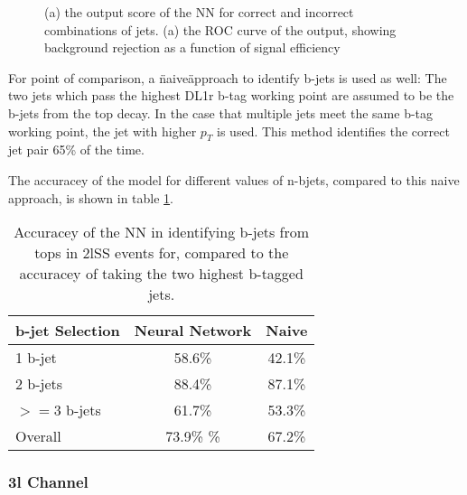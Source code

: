 \begin{figure}[h!]
  \label{fig:top2lSSresults}
  \caption{(a) the output score of the NN for correct and incorrect combinations of jets. (a) the ROC curve of the output, showing background rejection as a function of signal efficiency}
\end{figure}

For point of comparison, a \"naive\" approach to identify b-jets is used as well: The two jets which pass the highest DL1r b-tag working point are assumed to be the b-jets from the top decay. In the case that multiple jets meet the same b-tag working point, the jet with higher $p_T$ is used. This method identifies the correct jet pair 65\% of the time. 

The accuracey of the model for different values of n-bjets, compared to this naive approach, is shown in table \ref{tab:topMatchAcc2lSS}.

\begin{table}[h!]
  \centering
  \caption{Accuracey of the NN in identifying b-jets from tops in 2lSS events for, compared to the accuracey of taking the two highest b-tagged jets.}
  \begin{tabular}{l|c|c}
    \hline\hline
    b-jet Selection & Neural Network & Naive \\
    \hline
    1 b-jet & 58.6\% & 42.1\% \\
    2 b-jets & 88.4\% & 87.1\% \\
    $>=$3 b-jets & 61.7\% & 53.3\% \\
    \hline
    Overall & 73.9\% \% & 67.2\% \\                                                                                  
    \hline                                                                                                 
  \end{tabular}
  \label{tab:topMatchAcc2lSS}                                                                                           
\end{table}

\subsubsection{3l Channel}
\label{subsec:top3l}
 
